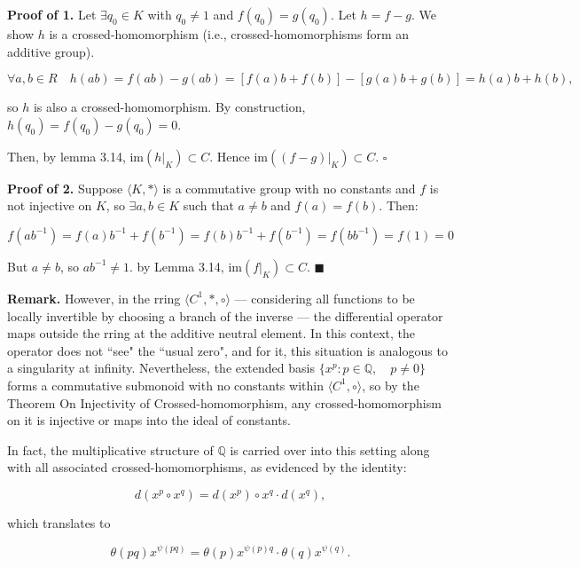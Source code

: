 \documentclass[12pt]{article}
\theoremstyle{definition}
\begin{document}
\vspace{10pt}
\noindent\textbf{Proof of 1.}  Let $\exists q_0 \in K$ with $q_0 \neq 1$ and $f(q_0) = g(q_0)$.  
Let $h = f - g$. We show $h$ is a crossed-homomorphism (i.e., crossed-homomorphisms form an additive group).  

\[
\forall a, b \in R \quad h(ab) = f(ab) - g(ab) = [f(a)b + f(b)] - [g(a)b + g(b)] = h(a)b + h(b),
\]

so $h$ is also a crossed-homomorphism. By construction, $h(q_0) = f(q_0)-g(q_0) = 0$.

\vspace{5pt}
\noindent Then, by lemma 3.14, $\mathrm{im}(h|_K) \subset C$. Hence $\mathrm{im}((f - g)|_K) \subset C$. $\square$


\vspace{10pt}
\noindent\textbf{Proof of 2.}  
 Suppose $\langle K, * \rangle$ is a commutative group with no constants and $f$ is not injective on $K$, so $\exists a, b \in K$ such that $a \neq b$ and $f(a) = f(b)$. Then:

\[
f(ab^{-1}) = f(a)b^{-1} + f(b^{-1}) = f(b)b^{-1} + f(b^{-1}) = f(bb^{-1}) = f(1) = 0
\]

\noindent But $a \neq b$, so $ab^{-1} \neq 1$. by Lemma 3.14, $\mathrm{im}(f|_K) \subset C$. $\blacksquare$


\vspace{10pt}
\noindent\textbf{Remark.} However, in the rring $\langle C^1, *, \circ \rangle$ --- considering all functions to be locally invertible by choosing a branch of the inverse --- the differential operator maps outside the rring at the additive neutral element. In this context, the operator does not ``see" the ``usual zero", and for it, this situation is analogous to a singularity at infinity. Nevertheless, the extended basis $\{x^p : p \in \mathbb{Q}, \quad p \neq 0\}$ forms a commutative submonoid with no constants within $\langle C^1, \circ \rangle$, so by the Theorem On Injectivity of Crossed-homomorphism, any crossed-homomorphism on it is injective or maps into the ideal of constants.

\vspace{5pt}
In fact, the multiplicative structure of $\mathbb{Q}$ is carried over into this setting along with all associated crossed-homomorphisms, as evidenced by the identity:

\[
d(x^p \circ x^q) = d(x^p) \circ x^q \cdot d(x^q),
\]

which translates to

\[
\theta(pq) x^{\psi(pq)} = \theta(p) x^{\psi(p) q} \cdot \theta(q) x^{\psi(q)}.
\]
\end{document}

